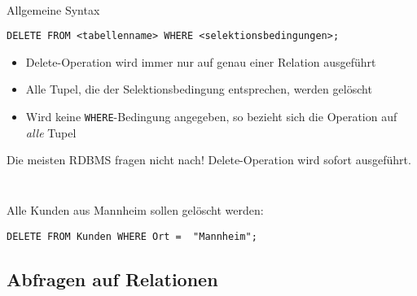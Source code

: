\begin{frame}[fragile]
\frametitle{\insertsection}
\framesubtitle{\insertsubsection}
\onslide
{}\\[4pt]
	\begin{block}{Allgemeine Syntax}
	\begin{lstlisting}[xleftmargin=3ex, numbers=none]
DELETE FROM <tabellenname> WHERE <selektionsbedingungen>;
		\end{lstlisting}
	\end{block}
\abs\pause
\begin{itemize}
	\item Delete-Operation wird immer nur auf genau einer Relation ausgeführt
	\item Alle Tupel, die der Selektionsbedingung entsprechen, werden gelöscht
	\item Wird keine \texttt{WHERE}-Bedingung angegeben, so bezieht sich die Operation auf 
	\textit{alle} Tupel
\end{itemize}
\pause
\alert{Die meisten RDBMS fragen nicht nach! Delete-Operation wird sofort ausgeführt.}
\end{frame}

\begin{frame}[fragile]\frametitle{\insertsection}
	\framesubtitle{\insertsubsection}
\\[4pt]
Alle Kunden aus Mannheim sollen gelöscht werden:
\begin{lstlisting}[xleftmargin=3ex, numbers=none]
DELETE FROM Kunden WHERE Ort =  "Mannheim";
\end{lstlisting}
\end{frame}

\subsection{Abfragen auf Relationen}

